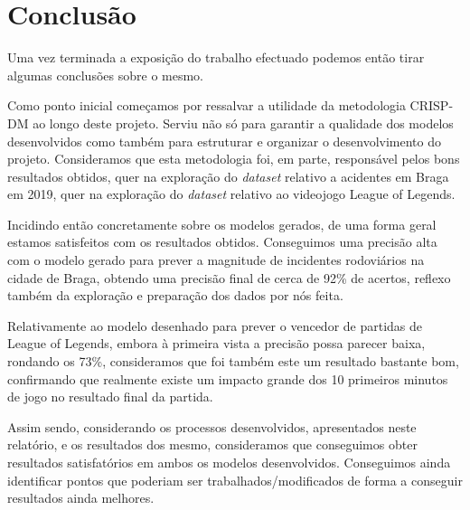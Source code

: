 \section{Conclusão}
Uma vez terminada a exposição do trabalho efectuado podemos então tirar algumas conclusões sobre o mesmo. 

Como ponto inicial começamos por ressalvar a utilidade da metodologia CRISP-DM ao longo deste projeto. Serviu não só para garantir a qualidade dos modelos desenvolvidos como também para estruturar e organizar o desenvolvimento do projeto. Consideramos que esta metodologia foi, em parte, responsável pelos bons resultados obtidos, quer na exploração do \textit{dataset} relativo a acidentes em Braga em 2019, quer na exploração do \textit{dataset} relativo ao videojogo League of Legends. 

Incidindo então concretamente sobre os modelos gerados, de uma forma geral estamos satisfeitos com os resultados obtidos. Conseguimos uma precisão alta com o modelo gerado para prever a magnitude de incidentes rodoviários na cidade de Braga, obtendo uma precisão final de cerca de 92\% de acertos, reflexo também da exploração e preparação dos dados por nós feita.

Relativamente ao modelo desenhado para prever o vencedor de partidas de League of Legends, embora à primeira vista a precisão possa parecer baixa, rondando os 73\%, consideramos que foi também este um resultado bastante bom, confirmando que realmente existe um impacto grande dos 10 primeiros minutos de jogo no resultado final da partida.

Assim sendo, considerando os processos desenvolvidos, apresentados neste relatório,  e os resultados dos mesmo, consideramos que conseguimos obter resultados satisfatórios em ambos os modelos desenvolvidos. Conseguimos ainda identificar pontos que poderiam ser trabalhados/modificados de forma a conseguir resultados ainda melhores.